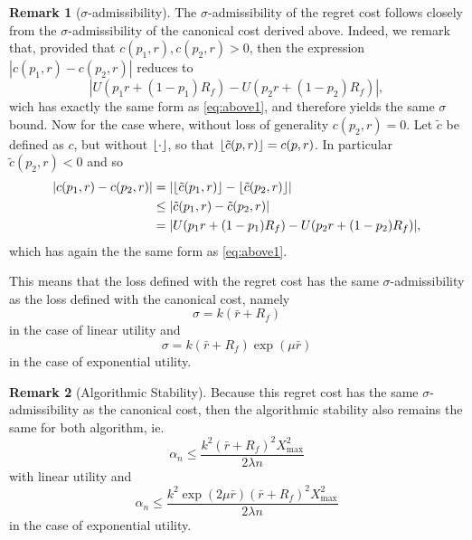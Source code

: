 \documentclass[11pt]{article}
\DeclarePairedDelimiter\floor{\lfloor}{\rfloor}
\theoremstyle{plain}
\theoremstyle{definition}
\newtheorem*{rem}{Remark}
\begin{document}
\begin{rem}[$\sigma$-admissibility]
  The $\sigma$-admissibility of the regret cost follows closely from the
  $\sigma$-admissibility of the canonical cost derived above. Indeed, we remark that,
  provided that $c(p_1,r), c(p_2,r) > 0$, then the expression $|c(p_1,r) - c(p_2,r)|$
  reduces to 
  \begin{equation}
    |U(p_1r + (1-p_1)R_f) - U(p_2r + (1-p_2)R_f)|,
  \end{equation}
  wich has exactly the same form as \eqref{eq:above1}, and therefore yields the same
  $\sigma$ bound. Now for the case where, without loss of generality $c(p_2,r) = 0$. Let
  $\tilde c$ be defined as $c$, but without $\floor{\cdot}$, so that
  $\floor{\tilde{c}(p,r)} = c(p,r)$. In particular $\tilde c(p_2,r)<0$ and so
  \begin{align}
    |c(p_1,r) - c(p_2,r)| &= |\floor{\tilde c(p_1,r)} - \floor{\tilde c(p_2,r)}|\\
    &\leq |\tilde c(p_1,r) - \tilde c(p_2,r)|\\
    &= |U(p_1r + (1-p_1)R_f) - U(p_2r + (1-p_2)R_f)|,
  \end{align}
  which has again the the same form as \eqref{eq:above1}.

  This means that the loss defined with the regret cost has the same
  $\sigma$-admissibility as the loss defined with the canonical cost, namely 
  \begin{equation}
    \sigma = k(\bar r + R_f)
  \end{equation}
  in the case of linear utility and 
  \begin{equation}
    \sigma = k(\bar r+R_f) \exp(\mu\bar r)
  \end{equation}
  in the case of exponential utility. 
\end{rem}

\begin{rem}[Algorithmic Stability]
  Because this regret cost has the same $\sigma$-admissibility as the canonical cost, then
  the algorithmic stability also remains the same for both algorithm, ie.
  \begin{equation}
    \alpha_n \leq \frac{k^2(\bar r+R_f)^2X^2_{\max}}{2\lambda n}
  \end{equation}
  with linear utility and
  \begin{equation}
    \alpha_n \leq \frac{k^2 \exp(2\mu\bar r)(\bar r + R_f)^2 X^2_{\max}}{2\lambda n}
  \end{equation}
  in the case of exponential utility.
\end{rem}
\end{document}
